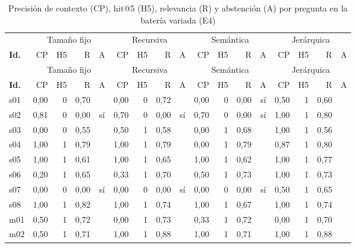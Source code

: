 \begin{scriptsize}
\setlength{\tabcolsep}{2.2pt}\renewcommand{\arraystretch}{0.92}
\begin{longtable}{@{}l rrrc rrrc rrrc rrrc@{}}
\caption[Precisión, hit@5, relevancia y abstención por pregunta (E4)]{Precisión de contexto (CP), hit@5 (H5), relevancia (R) y abstención (A) por pregunta en la batería variada (E4)}\label{tab:ap-e4-detalle}\\
\toprule
& \multicolumn{4}{c}{Tamaño fijo} & \multicolumn{4}{c}{Recursiva} & \multicolumn{4}{c}{Semántica} & \multicolumn{4}{c}{Jerárquica} \\
\cmidrule(lr){2-5}\cmidrule(lr){6-9}\cmidrule(lr){10-13}\cmidrule(lr){14-17}
\textbf{Id.} & CP & H5 & R & A & CP & H5 & R & A & CP & H5 & R & A & CP & H5 & R & A \\
\midrule
\endfirsthead
\toprule
& \multicolumn{4}{c}{Tamaño fijo} & \multicolumn{4}{c}{Recursiva} & \multicolumn{4}{c}{Semántica} & \multicolumn{4}{c}{Jerárquica} \\
\cmidrule(lr){2-5}\cmidrule(lr){6-9}\cmidrule(lr){10-13}\cmidrule(lr){14-17}
\textbf{Id.} & CP & H5 & R & A & CP & H5 & R & A & CP & H5 & R & A & CP & H5 & R & A \\
\midrule
\endhead
s01 & 0,00 & 0 & 0,70 &  & 0,00 & 0 & 0,72 &  & 0,00 & 0 & 0,00 & sí & 0,50 & 1 & 0,60 &  \\
s02 & 0,81 & 0 & 0,00 & sí & 0,70 & 0 & 0,00 & sí & 0,70 & 0 & 0,00 & sí & 1,00 & 1 & 0,80 &  \\
s03 & 0,00 & 0 & 0,55 &  & 0,50 & 1 & 0,58 &  & 0,00 & 1 & 0,68 &  & 1,00 & 1 & 0,56 &  \\
s04 & 1,00 & 1 & 0,79 &  & 1,00 & 1 & 0,79 &  & 0,00 & 1 & 0,79 &  & 0,87 & 1 & 0,80 &  \\
s05 & 1,00 & 1 & 0,61 &  & 1,00 & 1 & 0,65 &  & 1,00 & 1 & 0,62 &  & 1,00 & 1 & 0,77 &  \\
s06 & 0,20 & 1 & 0,65 &  & 0,33 & 1 & 0,70 &  & 0,50 & 1 & 0,73 &  & 1,00 & 1 & 0,73 &  \\
s07 & 0,00 & 0 & 0,00 & sí & 0,00 & 0 & 0,00 & sí & 0,00 & 0 & 0,00 & sí & 0,50 & 1 & 0,65 &  \\
s08 & 1,00 & 1 & 0,82 &  & 1,00 & 1 & 0,74 &  & 1,00 & 1 & 0,67 &  & 1,00 & 1 & 0,74 &  \\
m01 & 0,50 & 1 & 0,72 &  & 0,00 & 1 & 0,73 &  & 0,33 & 1 & 0,72 &  & 0,00 & 1 & 0,70 &  \\
m02 & 0,50 & 1 & 0,71 &  & 1,00 & 1 & 0,88 &  & 1,00 & 1 & 0,71 &  & 1,00 & 1 & 0,88 &  \\

\end{longtable}
\end{scriptsize}
